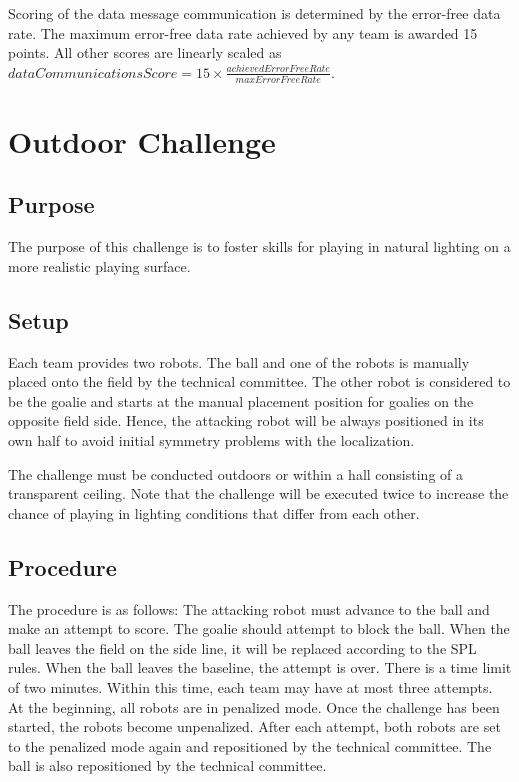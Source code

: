 \documentclass[12pt]{article}
\begin{document}
Scoring of the data message communication is determined by the error-free data rate. The maximum error-free data rate achieved by any team is awarded 15 points. All other scores are linearly scaled as $dataCommunicationsScore = 15 \times \frac{achievedErrorFreeRate}{maxErrorFreeRate}$. 

\newpage



\section{Outdoor Challenge}

\subsection{Purpose}
The purpose of this challenge is to foster skills for playing in natural lighting on a more realistic playing surface.

\subsection{Setup}
Each team provides two robots. The ball and one of the robots is manually placed onto the field by the technical committee. The other robot is considered to be the goalie and starts at the manual placement position for goalies on the opposite field side. Hence, the attacking robot will be always positioned in its own half to avoid initial symmetry problems with the localization.

The challenge must be conducted outdoors or within a hall consisting of a transparent ceiling. Note that the challenge will be executed twice to increase the chance of playing in lighting conditions that differ from each other.

\subsection{Procedure}
The procedure is as follows: The attacking robot must advance to the ball and make an attempt to score. The goalie should attempt to block the ball. When the ball leaves the field on the side line, it will be replaced according to the SPL rules. When the ball leaves the baseline, the attempt is over. There is a time limit of two minutes. Within this time, each team may have at most three attempts. At the beginning, all robots are in penalized mode. Once the challenge has been started, the robots become unpenalized. After each attempt, both robots are set to the penalized mode again and repositioned by the technical committee.  The ball is also repositioned by the technical committee.
\end{document}

